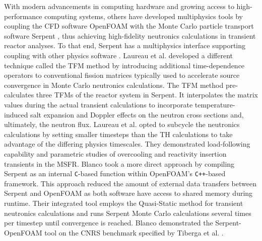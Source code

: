 With modern advancements in computing hardware and growing access to
high-performance computing systems, others have developed multiphysics tools by
coupling the \gls{CFD} software OpenFOAM
\cite{the_openfoam_foundation_ltd_openfoam_2021} with the Monte Carlo particle
transport software Serpent \cite{leppanen_serpent_2014}, thus achieving
high-fidelity neutronics calculations in transient reactor analyses. To that end,
Serpent has a multiphysics interface supporting coupling
with other physics software \cite{leppanen_development_2013}. Laureau et al.
\cite{laureau_transient_2017} developed a different technique called the
\gls{TFM} method by introducing additional time-dependence
operators to conventional fission matrices typically used to accelerate source
convergence in Monte Carlo neutronics calculations. The \gls{TFM} method
pre-calculates three \glspl{TFM} of the reactor system in Serpent. It
interpolates the matrix values during the actual transient calculations to
incorporate temperature-induced salt expansion and Doppler
effects on the neutron cross sections and, ultimately, the neutron flux. Laureau et al. opted to
subcycle the neutronics calculations by setting smaller timesteps than the \gls{TH} calculations
to take advantage of the differing physics timescales. They demonstrated load-following capability
and parametric studies of overcooling and reactivity insertion transients in the \gls{MSFR}.
Blanco \cite{blanco_neutronic_2020} took a more direct approach by
compiling Serpent as an internal \texttt{C}-based function within OpenFOAM's
\texttt{C++}-based framework. This approach reduced the amount of external data
transfers between Serpent and OpenFOAM as both software have access to shared
memory during runtime. Their integrated tool employs the Quasi-Static
method for transient neutronics calculations and runs Serpent Monte Carlo
calculations several times per timestep until convergence is reached.
Blanco demonstrated the Serpent-OpenFOAM tool on the CNRS benchmark specified by Tiberga et al.
\cite{tiberga_results_2020}.

